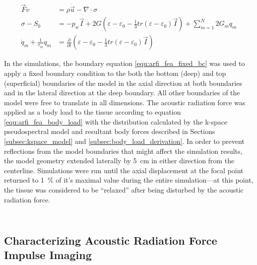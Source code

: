 			\begin{subequations}
				\label{fea:time_deformation}
				\begin{align}
					\vec{F} v &= \rho \ddot{\vec{u}} - \nabla \cdot \sigma \\
					\sigma - S_0 &= - p_w \vec{I} + 2 G\left(\varepsilon - \varepsilon_0 - \frac{1}{3} tr(\varepsilon - \varepsilon_0)\vec{I}\right) + \sum_{m=1}^N 2G_m q_m \\
					\dot{q}_m + \frac{1}{\tau_m} q_m &= \frac{\partial}{\partial t}\left(\varepsilon - \varepsilon_0 - \frac{1}{3} tr(\varepsilon - \varepsilon_0)\vec{I}\right)
				\end{align}
			\end{subequations}

			In the simulations, the boundary equation \ref{equ:arfi_fea_fixed_bc} was used to apply a fixed boundary condition to the both the bottom (deep) and top (superficial) boundaries of the model in the axial direction at both boundaries and in the lateral direction at the deep boundary. All other boundaries of the model were free to translate in all dimensions. The acoustic radiation force was applied as a body load to the tissue according to equation \ref{equ:arfi_fea_body_load} with the distribution calculated by the k-space pseudospectral model and resultant body forces described in Sections \ref{subsec:kspace_model} and \ref{subsec:body_load_derivation}. In order to prevent reflections from the model boundaries that might affect the simulation results, the model geometry extended laterally by \SI{5}{\cm} in either direction from the centerline. Simulations were run until the axial displacement at the focal point returned to \SI{1}{\percent} of it's maximal value during the entire simulation---at this point, the tissue was considered to be ``relaxed'' after being disturbed by the acoustic radiation force.

			\begin{equation}
				\label{equ:arfi_fea_fixed_bc}
			\end{equation}

			\begin{equation}
				\label{equ:arfi_fea_body_load}
			\end{equation}

		\subsection{Characterizing Acoustic Radiation Force Impulse Imaging}

